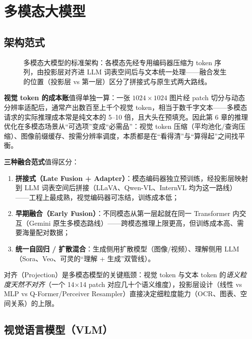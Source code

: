\documentclass[12pt,a4paper]{article}
\begin{document}
\section{多模态大模型}

\subsection{架构范式}

\begin{figure}[htbp]
\centering
\resizebox{\textwidth}{!}{%

}%
\caption{多模态大模型的标准架构：各模态先经专用编码器压缩为 token 序列，由投影层对齐进 LLM 词表空间后与文本统一处理——融合发生的位置（投影层 vs 第一层）区分了拼接式与原生式两大路线。}
\label{fig:mm}
\end{figure}

\textbf{视觉 token 的成本账}值得单独一算：一张 $1024\times1024$ 图片经 patch 切分与动态分辨率适配后，通常产出数百至上千个视觉 token，相当于数千字文本——多模态请求的实际推理成本常是纯文本的 5--10 倍，且大头在预填充。因此第 6 章的推理优化在多模态场景从“可选项”变成“必需品”：视觉 token 压缩（平均池化/查询压缩）、图像前缀缓存、按需分辨率调度，本质都是在“看得清”与“算得起”之间找平衡。

\textbf{三种融合范式}值得区分：
\begin{enumerate}
  \item \textbf{拼接式（Late Fusion + Adapter）}：模态编码器独立预训练，经投影层映射到 LLM 词表空间后拼接（LLaVA、Qwen-VL、InternVL 均为这一路线）——工程上最成熟，视觉编码器可冻结，训练成本低；
  \item \textbf{早期融合（Early Fusion）}：不同模态从第一层起就在同一 Transformer 内交互（Gemini 原生多模态路线）——跨模态推理上限更高，但训练成本高、需要海量配对数据；
  \item \textbf{统一自回归 / 扩散混合}：生成侧用扩散模型（图像/视频）、理解侧用 LLM（Sora、Veo、可灵的“理解 + 生成”双管线）。
\end{enumerate}
对齐（Projection）是多模态模型的关键瓶颈：视觉 token 与文本 token 的\emph{语义粒度天然不对齐}（一个 14$\times$14 patch 对应几十个语义维度），投影层设计（线性 vs MLP vs Q-Former/Perceiver Resampler）直接决定细粒度能力（OCR、图表、空间关系）的上限。

\subsection{视觉语言模型（VLM）}
\end{document}
